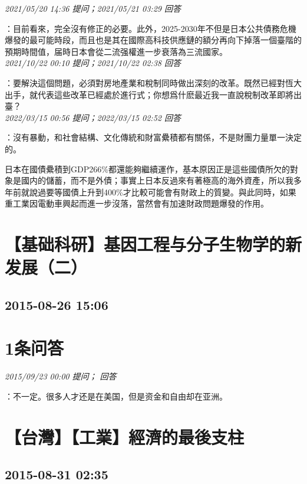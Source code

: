 \documentclass[twocolumn]{ctexart}
\begin{document}
\textit{\hfill\noindent\small 2021/05/20 14:36 提问；2021/05/21 03:29 回答}

：目前看來，完全沒有修正的必要。此外，2025-2030年不但是日本公共債務危機爆發的最可能時段，而且也是其在國際高科技供應鏈的額分再向下掉落一個臺階的預期時間值，届時日本會從二流强權進一步衰落為三流國家。
\\

\textit{\hfill\noindent\small 2021/10/22 00:10 提问；2021/10/22 02:38 回答}

：要解決這個問題，必須對房地產業和稅制同時做出深刻的改革。既然已經對恆大出手，就代表這些改革已經處於進行式；你想爲什麽最近我一直說稅制改革即將出臺？
\\

\textit{\hfill\noindent\small 2022/03/15 00:56 提问；2022/03/15 02:52 回答}

：沒有暴動，和社會結構、文化傳統和財富纍積都有關係，不是財團力量單一決定的。

日本在國債纍積到GDP266\%都還能夠繼續運作，基本原因正是這些國債所欠的對象是國内的儲蓄，而不是外債；事實上日本反過來有著極高的海外資產，所以我多年前就說過要等國債上升到400\%才比較可能會有財政上的質變。與此同時，如果重工業因電動車興起而進一步沒落，當然會有加速財政問題爆發的作用。
\\


\section{【基础科研】基因工程与分子生物学的新发展（二）}
\subsection{2015-08-26 15:06}


\section{1条问答}

\textit{\hfill\noindent\small 2015/09/23 00:00 提问； 回答}

：不一定。很多人才还是在美国，但是资金和自由却在亚洲。\\


\section{【台灣】【工業】經濟的最後支柱}
\subsection{2015-08-31 02:35}
\end{document}
